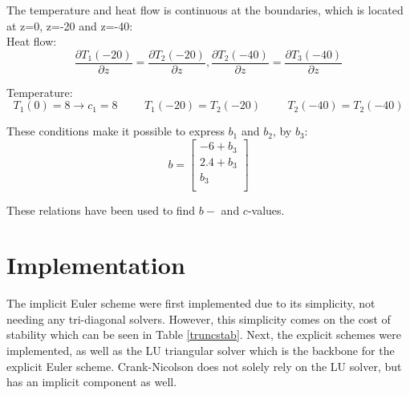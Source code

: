 \documentclass[10pt,a4paper]{article}
\begin{document}
\noindent The temperature and heat flow is continuous at the boundaries, which is located at z=0, z=-20 and z=-40:\\

\noindent Heat flow:
\begin{equation}
\frac{ \partial T_1(-20)}{\partial z}=\frac{\partial T_2(-20)}{\partial z},
\frac{\partial T_2(-40)}{\partial z}=\frac{\partial T_3(-40)}{\partial z}
\end{equation}

\noindent Temperature:
\begin{equation}
T_1(0)=8 \rightarrow c_1=8 \hspace{1cm}
T_1(-20)=T_2(-20) \hspace{1cm}
T_2(-40)=T_2(-40)
\end{equation}




\noindent These conditions make it possible to express $b_1$ and $b_2$, by $b_3$:\\

\begin{equation}
b=\begin{bmatrix}
-6+b_3\\
2.4+b_3\\
b_3\\
\end{bmatrix}
\end{equation}

\noindent These relations have been used to find $b-$ and $c$-values.






\section*{Implementation}

\noindent The implicit Euler scheme were first implemented due to its simplicity, not needing any tri-diagonal solvers. However, this simplicity comes on the cost of stability which can be seen in Table \ref{truncstab}. Next, the explicit schemes were implemented, as well as the LU triangular solver which is the backbone for the explicit Euler scheme. Crank-Nicolson does not solely rely on the LU solver, but has an implicit component as well.\\
\end{document}
